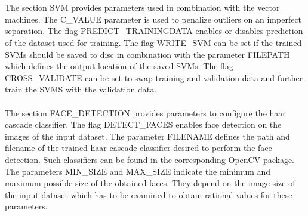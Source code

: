 \\
\\
The section SVM provides parameters used in combination with the vector machines. The C\_VALUE parameter is used to penalize outliers on an imperfect separation. The flag PREDICT\_TRAININGDATA enables or disables prediction of the dataset used for training. The flag WRITE\_SVM can be set if the trained SVMs should be saved to disc in combination with the parameter FILEPATH which defines the output location of the saved SVMs. The flag CROSS\_VALIDATE can be set to swap training and validation data and further train the SVMS with the validation data.
\\
\\
The section FACE\_DETECTION provides parameters to configure the haar cascade classifier. The flag DETECT\_FACES enables face detection on the images of the input dataset. The parameter FILENAME defines the path and filename of the trained haar cascade classifier desired to perform the face detection. Such classifiers can be found in the corresponding OpenCV package. The parameters MIN\_SIZE and MAX\_SIZE indicate the minimum and maximum possible size of the obtained faces. They depend on the image size of the input dataset which has to be examined to obtain rational values for these parameters.
